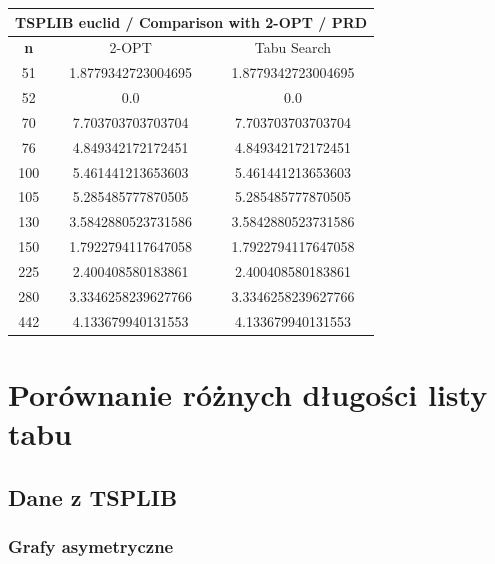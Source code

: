 \documentclass{article}
\begin{document}
\begin{center}
\begin{tabular}{|c|c|c|}
\hline
\multicolumn{3}{|c|}{\textbf{TSPLIB euclid / Comparison with 2-OPT / PRD}}\\
\hline
\textbf{n} & 2-OPT & Tabu Search\\
\hline
51 & 1.8779342723004695 & 1.8779342723004695\\
\hline
52 & 0.0 & 0.0\\
\hline
70 & 7.703703703703704 & 7.703703703703704\\
\hline
76 & 4.849342172172451 & 4.849342172172451\\
\hline
100 & 5.461441213653603 & 5.461441213653603\\
\hline
105 & 5.285485777870505 & 5.285485777870505\\
\hline
130 & 3.5842880523731586 & 3.5842880523731586\\
\hline
150 & 1.7922794117647058 & 1.7922794117647058\\
\hline
225 & 2.400408580183861 & 2.400408580183861\\
\hline
280 & 3.3346258239627766 & 3.3346258239627766\\
\hline
442 & 4.133679940131553 & 4.133679940131553\\
\hline
\end{tabular}
\end{center}




\section{Porównanie różnych długości listy tabu}

\subsection{Dane z TSPLIB}

\subsubsection{Grafy asymetryczne}
\end{document}
